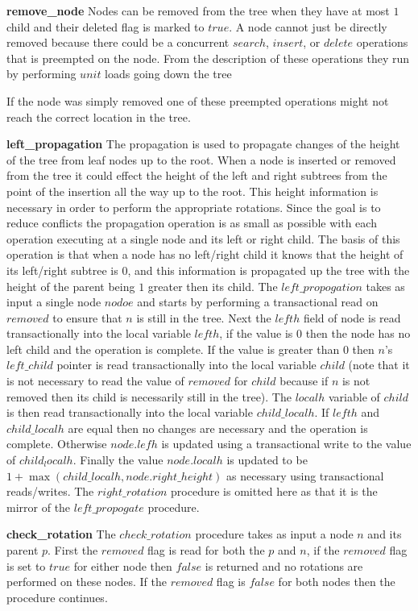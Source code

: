 \documentclass[10pt]{sigplanconf}
\begin{document}
{\bf remove\_node} Nodes can be removed from the tree when they have at most $1$ child and their deleted flag is marked to $true$.
A node cannot just be directly removed because there could be a concurrent $search$, $insert$, or $delete$ operations that is preempted on the node.
From the description of these operations they run by performing $unit$ loads going down the tree 


If the node was simply removed one of these preempted operations might not reach the correct location in the tree. 

{\bf left\_propagation} The propagation is used to propagate changes of the height of the tree from leaf nodes up to the root.
When a node is inserted or removed from the tree it could effect the height of the left and right subtrees from the point of the insertion all the way up to the root.
This height information is necessary in order to perform the appropriate rotations.
Since the goal is to reduce conflicts the propagation operation is as small as possible with each operation executing at a single node and its left or right child.
The basis of this operation is that when a node has no left/right child it knows that the height of its left/right subtree is $0$, and this information is propagated up the tree with the height of the parent being $1$ greater then its child.
The $left\_propogation$ takes as input a single node $nodoe$ and starts by performing a transactional read on $removed$ to ensure that $n$ is still in the tree.
Next the $lefth$ field of node is read transactionally into the local variable $lefth$, if the value is $0$ then the node has no left child and the operation is complete.
If the value is greater than $0$ then $n$'s $left\_child$ pointer is read transactionally into the local variable $child$ (note that it is not necessary to read the value of $removed$ for $child$ because if $n$ is not removed then its child is necessarily still in the tree).
The $localh$ variable of $child$ is then read transactionally into the local variable $child\_localh$.
If $lefth$ and $child\_localh$ are equal then no changes are necessary and the operation is complete.
Otherwise $node.lefh$ is updated using a transactional write to the value of $child_localh$.
Finally the value $node.localh$ is updated to be $1 + \max(child\_localh, node.right\_height)$ as necessary using transactional reads/writes.
The $right\_rotation$ procedure is omitted here as that it is the mirror of the $left\_propogate$ procedure.

{\bf check\_rotation} The $check\_rotation$ procedure takes as input a node $n$ and its parent $p$.
First the $removed$ flag is read for both the $p$ and $n$, if the $removed$ flag is set to $true$ for either node then $false$ is returned and no rotations are performed on these nodes.
If the $removed$ flag is $false$ for both nodes then the procedure continues.
\end{document}
